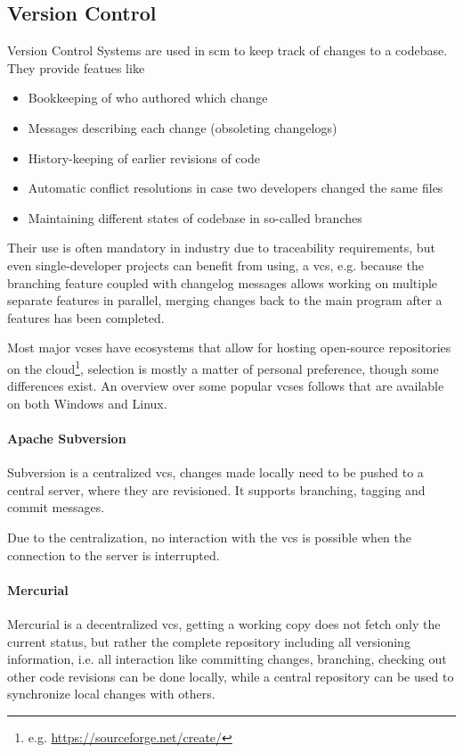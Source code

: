 \subsection{Version Control}
\gls{Version Control System}s  are used in \gls{scm} to keep track of changes to a codebase. They provide featues like
\begin{itemize}
	\item Bookkeeping of who authored which change
	\item Messages describing each change (obsoleting changelogs)
	\item History-keeping of earlier revisions of code
	\item Automatic conflict resolutions in case two developers changed the same files
	\item Maintaining different states of codebase in so-called branches
\end{itemize}

Their use is often mandatory in industry due to traceability requirements, but even single-developer projects can benefit from using, a \gls{vcs}, e.g. because the branching feature coupled with changelog messages allows working on multiple separate features in parallel, merging changes back to the main program after a features has been completed. 

Most major \gls{vcs}es have ecosystems that allow for hosting open-source repositories on the \gls{cloud}\footnote{e.g. \url{https://sourceforge.net/create/}}, selection is mostly a matter of personal preference, though some differences exist.
An overview over some popular \gls{vcs}es follows that are available on both Windows and Linux.

\paragraph{Apache Subversion}
Subversion is a centralized \gls{vcs}, changes made locally need to be pushed to a central server, where they are revisioned. It supports branching, tagging and commit messages.

Due to the centralization, no interaction with the \gls{vcs} is possible when the connection to the server is interrupted.

\paragraph{Mercurial}
Mercurial is a decentralized \gls{vcs}, getting a working copy does not fetch only the current status, but rather the complete repository including all versioning information, i.e. all interaction like committing changes, branching, checking out other code revisions can be done locally, while a central repository can be used to synchronize local changes with others.

